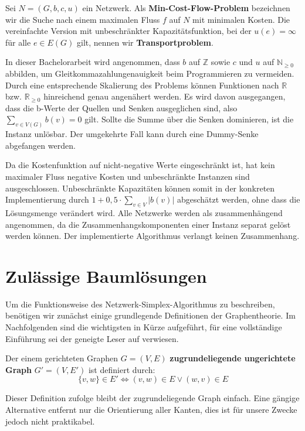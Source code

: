 \begin{defn}\label{defMCF} Sei $N=(G,b,c,u)$ ein Netzwerk. Als \textbf{Min-Cost-Flow-Problem} bezeichnen wir die Suche nach einem maximalen Fluss $f$ auf $N$ mit minimalen Kosten. Die vereinfachte Version mit unbeschränkter Kapazitätsfunktion, bei der $u(e)=\infty$ für alle $e\in E(G)$ gilt, nennen wir \textbf{Transportproblem}.\end{defn}

In dieser Bachelorarbeit wird angenommen, dass $b$ auf $\mathbb{Z}$ sowie $c$ und $u$ auf $\mathbb{N}_{\geq0}$ abbilden, um Gleitkommazahlungenauigkeit beim Programmieren zu vermeiden. Durch eine entsprechende Skalierung des Problems können Funktionen nach $\mathbb{R}$ bzw. $\mathbb{R}_{\geq 0}$ hinreichend genau angenähert werden. Es wird davon ausgegangen, dass die b-Werte der Quellen und Senken ausgeglichen sind, also $\sum_{v\in V(G)} b(v) = 0$ gilt. Sollte die Summe über die Senken dominieren, ist die Instanz unlösbar. Der umgekehrte Fall kann durch eine Dummy-Senke\footnotemark{} abgefangen werden.


Da die Kostenfunktion auf nicht-negative Werte eingeschränkt ist, hat kein maximaler Fluss negative Kosten und unbeschränkte Instanzen sind ausgeschlossen. Unbeschränkte Kapazitäten können somit in der konkreten Implementierung durch $1+0,5\cdot\sum_{v\in V} |b(v)|$ abgeschätzt werden, ohne dass die Lösungsmenge verändert wird. Alle Netzwerke werden als zusammenhängend angenommen, da die Zusammenhangskomponenten einer Instanz separat gelöst werden können. Der implementierte Algorithmus verlangt keinen Zusammenhang.

\section{Zulässige Baumlösungen}\label{ch:BL}
Um die Funktionsweise des Netzwerk-Simplex-Algorithmus zu beschreiben, benötigen wir zunächst einige grundlegende Definitionen der Graphentheorie. Im Nachfolgenden sind die wichtigsten in Kürze aufgeführt, für eine vollständige Einführung sei der geneigte Leser auf \cite{Alma} verwiesen.

\begin{defn}Der einem gerichteten Graphen $G=(V,E)$ \textbf{zugrundeliegende ungerichtete Graph} $G'=(V,E')$ ist definiert durch:
\begin{equation*}\{v,w\}\in E' \iff (v,w) \in E \lor (w,v) \in E\end{equation*} \end{defn}
\begin{anm}Dieser Definition zufolge bleibt der zugrundeliegende Graph einfach. Eine gängige Alternative entfernt nur die Orientierung aller Kanten, dies ist für unsere Zwecke jedoch nicht praktikabel.\end{anm}

